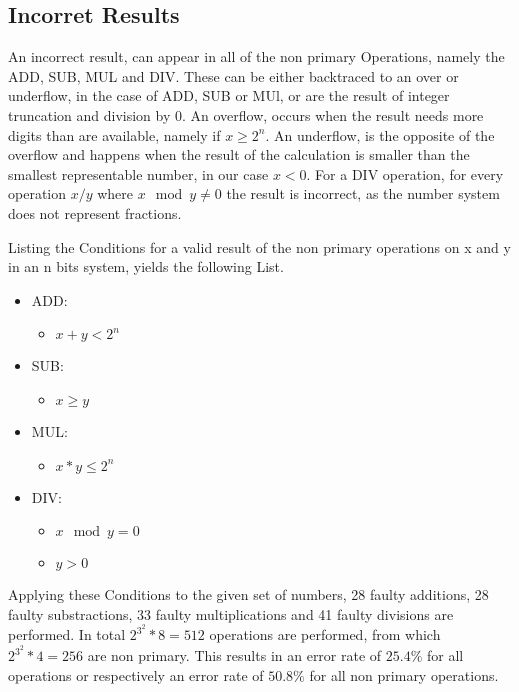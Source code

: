 \documentclass{aiaa-tc}
\begin{document}
\subsection{Incorret Results}
An incorrect result, can appear in all of the non primary Operations, namely the ADD, SUB, MUL and DIV. These can be either backtraced to an over or underflow,
in the case of ADD, SUB or MUl, or are the result of integer truncation and division by 0.
An overflow, occurs when the result needs more digits than are available, namely if $x \geq 2^n$. An underflow, is the opposite of the overflow and happens when the result
of the calculation is smaller than the smallest representable number, in our case $x < 0$.
For a DIV operation, for every operation $x/y$ where $x \mod y \neq 0$ the result is incorrect, as the number system does not represent fractions.

Listing the Conditions for a valid result of the non primary operations on x and y in an n bits system, yields the following List.
\begin{itemize}
    \item ADD: \begin{itemize}
        \item $x + y < 2^n$
    \end{itemize}
    \item SUB: \begin{itemize}
        \item $x \geq y $
    \end{itemize}
    \item MUL: \begin{itemize}
        \item $x * y \leq 2^n$
    \end{itemize}
    \item DIV: \begin{itemize}
        \item $x \mod y = 0$
        \item $y > 0$
    \end{itemize}
\end{itemize}

Applying these Conditions to the given set of numbers, 28 faulty additions, 28 faulty substractions, 33 faulty multiplications and 41 faulty divisions are performed.
In total $2^{3^{2}} * 8 = 512$ operations are performed, from which $2^{3^{2}} * 4 = 256$ are non primary. This results in an error rate of $25.4 \%$ for all operations
or respectively an error rate of $50.8 \%$ for all non primary operations.
\end{document}
